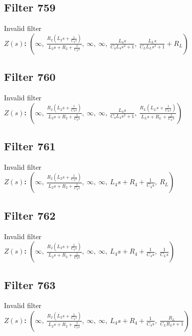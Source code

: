 \documentclass{article}
\begin{document}
\subsection*{Filter 759}
Invalid filter \\ 
\textbf{$Z(s)$:} $\left( \infty, \  \frac{R_{2} \left(L_{2} s + \frac{1}{C_{2} s}\right)}{L_{2} s + R_{2} + \frac{1}{C_{2} s}}, \  \infty, \  \infty, \  \frac{L_{4} s}{C_{4} L_{4} s^{2} + 1}, \  \frac{L_{L} s}{C_{L} L_{L} s^{2} + 1} + R_{L}\right)$ \\ 
\subsection*{Filter 760}
Invalid filter \\ 
\textbf{$Z(s)$:} $\left( \infty, \  \frac{R_{2} \left(L_{2} s + \frac{1}{C_{2} s}\right)}{L_{2} s + R_{2} + \frac{1}{C_{2} s}}, \  \infty, \  \infty, \  \frac{L_{4} s}{C_{4} L_{4} s^{2} + 1}, \  \frac{R_{L} \left(L_{L} s + \frac{1}{C_{L} s}\right)}{L_{L} s + R_{L} + \frac{1}{C_{L} s}}\right)$ \\ 
\subsection*{Filter 761}
Invalid filter \\ 
\textbf{$Z(s)$:} $\left( \infty, \  \frac{R_{2} \left(L_{2} s + \frac{1}{C_{2} s}\right)}{L_{2} s + R_{2} + \frac{1}{C_{2} s}}, \  \infty, \  \infty, \  L_{4} s + R_{4} + \frac{1}{C_{4} s}, \  R_{L}\right)$ \\ 
\subsection*{Filter 762}
Invalid filter \\ 
\textbf{$Z(s)$:} $\left( \infty, \  \frac{R_{2} \left(L_{2} s + \frac{1}{C_{2} s}\right)}{L_{2} s + R_{2} + \frac{1}{C_{2} s}}, \  \infty, \  \infty, \  L_{4} s + R_{4} + \frac{1}{C_{4} s}, \  \frac{1}{C_{L} s}\right)$ \\ 
\subsection*{Filter 763}
Invalid filter \\ 
\textbf{$Z(s)$:} $\left( \infty, \  \frac{R_{2} \left(L_{2} s + \frac{1}{C_{2} s}\right)}{L_{2} s + R_{2} + \frac{1}{C_{2} s}}, \  \infty, \  \infty, \  L_{4} s + R_{4} + \frac{1}{C_{4} s}, \  \frac{R_{L}}{C_{L} R_{L} s + 1}\right)$ \\ 
\end{document}
